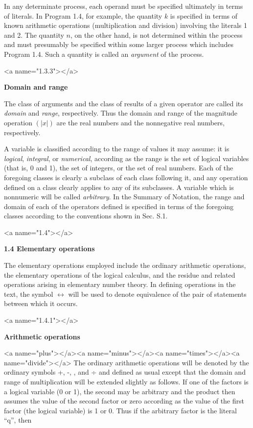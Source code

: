 \par In any determinate process, each operand must be specified ultimately in terms of literals. In Program 1.4, for example, the quantity $k$ is specified in terms of known arithmetic operations (multiplication and division) involving the literals 1 and 2. The quantity $n$, on the other hand, is not determined within the process and must presumably be specified within some larger process which includes Program 1.4. Such a quantity is called an \textit{argument} of the process.

<a name="1.3.3"></a>
\par \textbf{Domain and range}

\par The class of arguments and the class of results of a given operator are called its \textit{domain} and \textit{range}, respectively. Thus the domain and range of the magnitude operation $(|x|)$ are the real numbers and the nonnegative real numbers, respectively.

\par A variable is classified according to the range of values it may assume: it is \textit{logical}, \textit{integral}, or \textit{numerical}, according as the range is the set of logical variables (that is, 0 and 1), the set of integers, or the set of real numbers. Each of the foregoing classes is clearly a subclass of each class following it, and any operation defined on a class clearly applies to any of its subclasses. A variable which is nonnumeric will be called \textit{arbitrary}. In the Summary of Notation, the range and domain of each of the operators defined is specified in terms of the foregoing classes according to the conventions shown in Sec. S.1.

<a name="1.4"></a>
\par \textbf{1.4 Elementary operations}

\par The elementary operations employed include the ordinary arithmetic operations, the elementary operations of the logical calculus, and the residue and related operations arising in elementary number theory. In defining operations in the text, the symbol $\leftrightarrow$ will be used to denote equivalence of the pair of statements between which it occurs.

<a name="1.4.1"></a>
\par \textbf{Arithmetic operations}

<a name="plus"></a><a name="minus"></a><a name="times"></a><a name="divide"></a> The ordinary arithmetic operations will be denoted by the ordinary symbols +, -, \times, and ÷ and defined as usual except that the domain and range of multiplication will be extended slightly as follows. If one of the factors is a logical variable (0 or 1), the second may be arbitrary and the product then assumes the value of the second factor or zero according as the value of the first factor (the logical variable) is 1 or 0. Thus if the arbitrary factor is the literal ``q'', then

